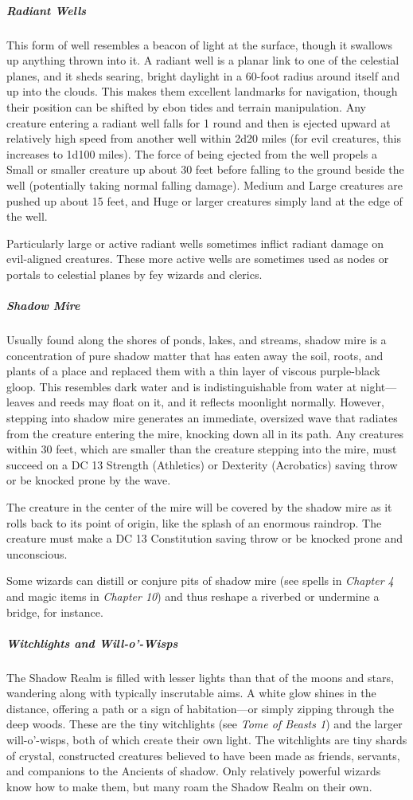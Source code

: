 \documentclass[10pt,a4paper,twoside,bg=print,twocolumn,openany,nodeprecatedcode]{dndbook}
\begin{document}
\subparagraph{Radiant Wells}
This form of well resembles a beacon of light at the surface, though it swallows up anything thrown into it. A radiant well is a planar link to one of the celestial planes, and it sheds searing, bright daylight in a 60-foot radius around itself and up into the clouds. This makes them excellent landmarks for navigation, though their position can be shifted by ebon tides and terrain manipulation. Any creature entering a radiant well falls for 1 round and then is ejected upward at relatively high speed from another well within 2d20 miles (for evil creatures, this increases to 1d100 miles). The force of being ejected from the well propels a Small or smaller creature up about 30 feet before falling to the ground beside the well (potentially taking normal falling damage). Medium and Large creatures are pushed up about 15 feet, and Huge or larger creatures simply land at the edge of the well.

Particularly large or active radiant wells sometimes inflict radiant damage on evil-aligned creatures. These more active wells are sometimes used as nodes or portals to celestial planes by fey wizards and clerics.

\subparagraph{Shadow Mire}
Usually found along the shores of ponds, lakes, and streams, shadow mire is a concentration of pure shadow matter that has eaten away the soil, roots, and plants of a place and replaced them with a thin layer of viscous purple-black gloop. This resembles dark water and is indistinguishable from water at night—leaves and reeds may float on it, and it reflects moonlight normally. However, stepping into shadow mire generates an immediate, oversized wave that radiates from the creature entering the mire, knocking down all in its path. Any creatures within 30 feet, which are smaller than the creature stepping into the mire, must succeed on a DC 13 Strength (Athletics) or Dexterity (Acrobatics) saving throw or be knocked prone by the wave.

The creature in the center of the mire will be covered by the shadow mire as it rolls back to its point of origin, like the splash of an enormous raindrop. The creature must make a DC 13 Constitution saving throw or be knocked prone and unconscious.

Some wizards can distill or conjure pits of shadow mire (see spells in \textit{Chapter 4} and magic items in \textit{Chapter 10}) and thus reshape a riverbed or undermine a bridge, for instance.

\subparagraph{Witchlights and Will-o'-Wisps}
The Shadow Realm is filled with lesser lights than that of the moons and stars, wandering along with typically inscrutable aims. A white glow shines in the distance, offering a path or a sign of habitation—or simply zipping through the deep woods. These are the tiny witchlights (see \textit{Tome of Beasts 1}) and the larger will-o'-wisps, both of which create their own light. The witchlights are tiny shards of crystal, constructed creatures believed to have been made as friends, servants, and companions to the Ancients of shadow. Only relatively powerful wizards know how to make them, but many roam the Shadow Realm on their own.
\end{document}
